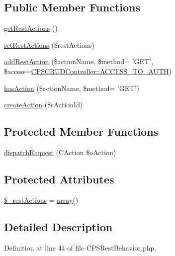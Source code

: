 \subsection*{Public Member Functions}
\begin{DoxyCompactItemize}
\item 
\hyperlink{classCPSRestBehavior_a6553035abe6356a4ca842b3830583410}{getRestActions} ()
\item 
\hyperlink{classCPSRestBehavior_ae769f00b96dcdb6c7c0c761c3a4de0cd}{setRestActions} (\$restActions)
\item 
\hyperlink{classCPSRestBehavior_ad2fda622d44df662f045744074950eb3}{addRestAction} (\$actionName, \$method= 'GET', \$access=\hyperlink{classCPSController_a437b41cb9e13e41157d57e7736366295}{CPSCRUDController::ACCESS\_\-TO\_\-AUTH})
\item 
\hyperlink{classCPSRestBehavior_ad63fb44302b80922988514238a32e6fa}{hasAction} (\$actionName, \$method= 'GET')
\item 
\hyperlink{classCPSRestBehavior_ae6184c2ab5f3c23fd889d48f6cb7b675}{createAction} (\$sActionId)
\end{DoxyCompactItemize}
\subsection*{Protected Member Functions}
\begin{DoxyCompactItemize}
\item 
\hyperlink{classCPSRestBehavior_a3c7475de624dc901f0531c2ed2b571af}{dispatchRequest} (CAction \$oAction)
\end{DoxyCompactItemize}
\subsection*{Protected Attributes}
\begin{DoxyCompactItemize}
\item 
\hyperlink{classCPSRestBehavior_a4e62c524fa45179f327db8f3513897a7}{\$\_\-restActions} = \hyperlink{list_8php_aa3205d038c7f8feb5c9f01ac4dfadc88}{array}()
\end{DoxyCompactItemize}


\subsection{Detailed Description}


Definition at line 44 of file CPSRestBehavior.php.




